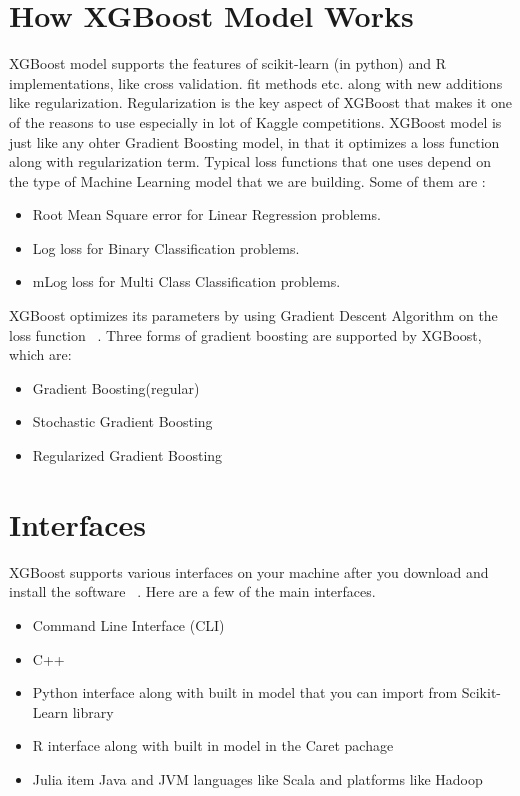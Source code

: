 \section{How XGBoost Model Works}

XGBoost model supports the features of scikit-learn (in python) and R
implementations, like cross validation. fit methods etc. along with new
additions like regularization.  Regularization is the key aspect of XGBoost that
makes it one of the reasons to use especially in  lot of Kaggle competitions.
XGBoost model is just like any ohter Gradient Boosting model, in that it
optimizes a loss function  along with regularization term. Typical loss
functions that one uses depend on the type of Machine Learning model that we are
building. Some of them are :

\begin{itemize}
\item Root Mean Square error for Linear Regression problems. 
\item Log loss for Binary Classification problems. 
\item mLog loss for Multi Class Classification problems.
\end{itemize}

XGBoost optimizes its parameters by using Gradient Descent Algorithm on the loss
function ~\cite{hid-sp18-401-XGBoost-MLmastery}. Three forms of gradient boosting 
are supported by XGBoost, which are:

\begin{itemize}
\item Gradient Boosting(regular)
\item Stochastic Gradient Boosting
\item Regularized Gradient Boosting 
\end{itemize}



\section{Interfaces}

XGBoost supports various interfaces on your machine after you download and
install the software ~\cite{hid-sp18-401-XGBoost-MLmastery}. Here are a few 
of the main interfaces.

\begin{itemize}
\item Command Line Interface (CLI)  
\item C++  
\item Python interface along with built in model that you can import 
from Scikit-Learn library   
\item R interface along with built in model in the Caret pachage  
\item Julia item Java and JVM languages like Scala and platforms like Hadoop
\end{itemize}




